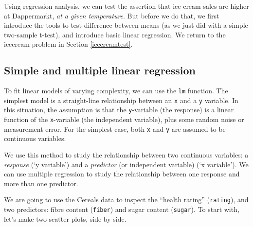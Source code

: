 \documentclass[]{book}
\begin{document}
Using regression analysis, we can test the assertion that ice cream sales are higher at Dappermarkt, \emph{at a given temperature}. But before we do that, we first introduce the tools to test difference between means (as we just did with a simple two-sample t-test), and introduce basic linear regression. We return to the icecream problem in Section \ref{icecreamtest}.

\hypertarget{simple-and-multiple-linear-regression}{%
\subsection{Simple and multiple linear regression}\label{simple-and-multiple-linear-regression}}

To fit linear models of varying complexity, we can use the \texttt{lm} function. The simplest model is a straight-line relationship between an \texttt{x} and a \texttt{y} variable. In this situation, the assumption is that the \texttt{y}-variable (the response) is a linear function of the \texttt{x}-variable (the independent variable), plus some random noise or measurement error. For the simplest case, both \texttt{x} and \texttt{y} are assumed to be continuous variables.

We use this method to study the relationship between two continuous variables: a \emph{response} (`y variable') and a \emph{predictor} (or independent variable) (`x variable'). We can use multiple regression to study the relationship between one response and more than one predictor.

We are going to use the Cereals data to inspect the ``health rating'' (\texttt{rating}), and two predictors: fibre content (\texttt{fiber}) and sugar content (\texttt{sugar}). To start with, let's make two scatter plots, side by side.
\end{document}
